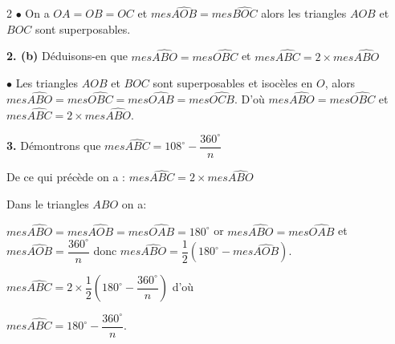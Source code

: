 \begin{multicols*}{2}
  	$\bullet$ On a $OA=OB=OC$ et $mes\widehat{AOB}=mes\widehat{BOC}$ alors les triangles $AOB$ et $BOC$ sont superposables.
  	
  	\textbf{2. (b)} Déduisons-en que  $mes\widehat{ABO}=mes\widehat{OBC}$ et $mes\widehat{ABC}=2\times mes\widehat{ABO}$
  	
  	$\bullet$ Les triangles $AOB$ et $BOC$ sont superposables et isocèles en $O$, alors  $mes\widehat{ABO}=mes\widehat{OBC}=mes\widehat{OAB}=mes\widehat{OCB}$.
  	D'où $mes\widehat{ABO}=mes\widehat{OBC}$ et $mes\widehat{ABC}=2\times mes\widehat{ABO}$.
  	
  	\textbf{3.} Démontrons que $mes\widehat{ABC}=108^\circ-\dfrac{360^\circ}{n}$
  	
  	De ce qui précède on a : $mes\widehat{ABC}=2\times mes\widehat{ABO}$
  	
  	Dans le triangles $ABO$ on a:
  	
  	$mes\widehat{ABO}=mes\widehat{AOB}=mes\widehat{OAB}=180^\circ$ or $mes\widehat{ABO}=mes\widehat{OAB}$ et $mes\widehat{AOB}=\dfrac{360^\circ}{n}$  donc $mes\widehat{ABO}=\dfrac{1}{2}(180^\circ- mes\widehat{AOB})$.
  	
  	$mes\widehat{ABC}=2\times \dfrac{1}{2}(180^\circ- \dfrac{360^\circ}{n})$ d'où
  	
  	$mes\widehat{ABC}=180^\circ- \dfrac{360^\circ}{n}$.
  	

\end{multicols*}
